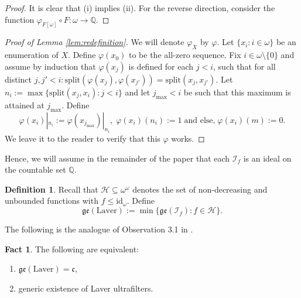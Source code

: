 \documentclass[12pt]{article}
\theoremstyle{definition}
\newtheorem{fct}[nummer]{\sc Fact}
\newtheorem{defi}[nummer]{\sc Definition}
\renewcommand{\phi}{\varphi}
\begin{document}
\begin{proof}
It is clear that (i) implies (ii). For the reverse direction, consider the function $\phi_{F[\omega]}\circ F: \omega \to \mathbb{Q}$.
\end{proof}

\begin{proof}[Proof of Lemma \ref{lem:redefinition}]
We will denote $\phi_X$ by $\phi$. Let $\{x_i: i \in \omega\}$ be an enumeration of $X$. Define $\phi(x_0)$ to be the all-zero sequence. Fix $i \in \omega \setminus \{0\}$ and assume by induction that $\phi(x_j)$ is defined for each $j < i$, such that for all distinct $j,j'<i: \text{split}(\phi(x_j),\phi(x_{j'}))= \text{split}(x_j,x_{j'})$. Let $n_i:=\max\{\text{split}(x_j,x_i): j<i\}$ and let $j_{\text{max}} <i$ be such that this maximum is attained at $j_{\text{max}}$. Define
\[\phi(x_i)|_{n_i}:=\phi(x_{j_{\text{max}}})|_{n_i},\; \phi(x_i)(n_i):=1\;\text{and else,}\; \phi(x_i)(m):=0.\]
We leave it to the reader to verify that this $\phi$ works.
\end{proof}

Hence, we will assume in the remainder of the paper that each $\mathcal{I}_f$ is an ideal on the countable set $\mathbb{Q}$.

\begin{defi}
Recall that $\mathcal{H}\subseteq\omega^\omega$ denotes the set of non-decreasing and unbounded functions with $f \leq \text{id}_{\omega}$. Define $$\mathfrak{ge}(\text{Laver}):=\min\{\mathfrak{ge}(\mathcal{I}_f) : f\in\mathcal{H}\}.$$
\end{defi}

The following is the analogue of Observation 3.1 in \cite{brefla17}.

\begin{fct}
The following are equivalent:
\begin{enumerate}[label=(\roman*)]
    \item $\mathfrak{ge}(\text{Laver})=\mathfrak{c}$,
    \item generic existence of Laver ultrafilters.
\end{enumerate}
\end{fct}
\end{document}
